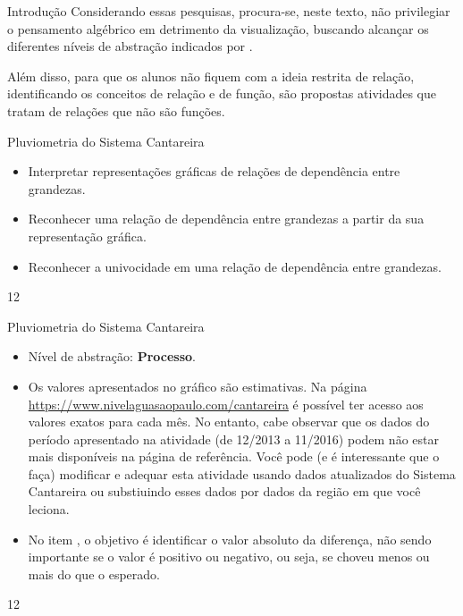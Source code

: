 \begin{apresentacao}{Introdução}
Considerando essas pesquisas, procura-se, neste texto, não privilegiar o pensamento algébrico em detrimento da visualização, buscando alcançar os diferentes níveis de abstração indicados por \cite{Jones2006}.

Além disso, para que os alunos não fiquem com a ideia restrita de relação, identificando os conceitos de relação e de função, são propostas atividades que tratam de relações que não são funções.

\end{apresentacao}



\clearmargin
\begin{objectives}{Pluviometria do Sistema Cantareira}
{
\begin{itemize}

\item Interpretar representações gráficas de relações de dependência entre grandezas.

\item Reconhecer uma relação de dependência entre grandezas a partir da sua representação gráfica.

\item Reconhecer a univocidade em uma relação de dependência entre grandezas.

\end{itemize}
}{1}{2}
\end{objectives}
\begin{sugestions}{Pluviometria do Sistema Cantareira}
{
\begin{itemize}
\item Nível de abstração: \textbf{Processo}.

\item Os valores apresentados no gráfico são estimativas. Na página \url{https://www.nivelaguasaopaulo.com/cantareira} é possível ter acesso aos valores exatos para cada mês. No entanto, cabe observar que os dados do período apresentado na atividade (de 12/2013 a 11/2016) podem não estar mais disponíveis na página de referência. Você pode (e é interessante que o faça) modificar e adequar esta atividade usando dados atualizados do Sistema Cantareira ou substiuindo esses dados por dados da região em que você leciona.

\item No item , o objetivo é identificar o valor absoluto da diferença, não sendo importante se o valor é positivo ou negativo, ou seja, se choveu menos ou mais do que o esperado.
\end{itemize}

}{1}{2}
\end{sugestions}
